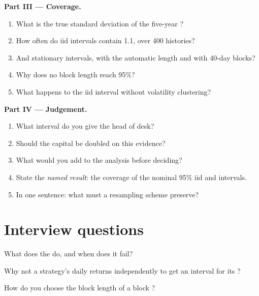 \begin{problem}
\medskip\noindent\textbf{Part III --- Coverage.}
\begin{enumerate}[resume]
\item What is the true standard deviation of the five-year ?
\item How often do iid intervals contain 1.1, over 400 histories?
\item And stationary intervals, with the automatic length and with 40-day blocks?
\item Why does no block length reach 95\%?
\item What happens to the iid interval without volatility clustering?
\end{enumerate}

\medskip\noindent\textbf{Part IV --- Judgement.}
\begin{enumerate}[resume]
\item What interval do you give the head of desk?
\item Should the capital be doubled on this evidence?
\item What would you add to the analysis before deciding?
\item State the \emph{named result}: the coverage of the nominal 95\% iid and  intervals.
\item In one sentence: what must a resampling scheme preserve?
\end{enumerate}
\end{problem}

\section{Interview questions}

\begin{interviewq}\label{iq:qm:resampling:1}
What does the  do, and when does it fail?
\end{interviewq}

\begin{interviewq}\label{iq:qm:resampling:2}
Why not  a strategy's daily returns independently to get an interval for its ?
\end{interviewq}

\begin{interviewq}\label{iq:qm:resampling:3}
How do you choose the block length of a block ?
\end{interviewq}

